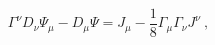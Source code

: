 \begin{equation}
\Gamma^\nu  D_\nu \Psi_\mu - D_\mu \Psi
 = J_\mu - \frac{1}{8} \Gamma_\mu \Gamma_\nu J^\nu ~,
\label{s3/2}
\end{equation}

